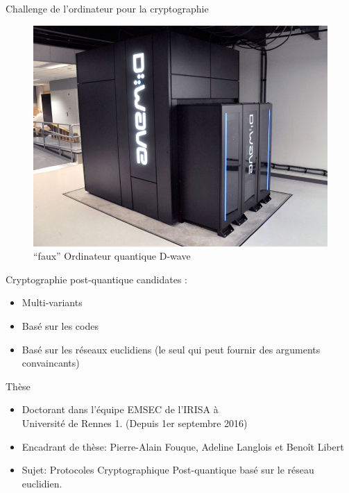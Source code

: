 \begin{frame}{Challenge de l'ordinateur pour la cryptographie}

  \begin{figure}[H]
    \centering
    \includegraphics[width= .2\textwidth]{./images/quantum.jpg}
    \caption{``faux'' Ordinateur quantique D-wave}
  \end{figure}
  
  Cryptographie post-quantique candidates :

  \begin{itemize}
  \item Multi-variants
  \item Bas\'e sur les codes
  \item Bas\'e sur les r\'eseaux euclidiens (le seul qui peut fournir des arguments convaincants)
  \end{itemize}

\end{frame}


\begin{frame}{Th\`ese}
  \begin{itemize}
  \item Doctorant dans l'\'equipe EMSEC de l'IRISA \`a \\Universit\'e de Rennes 1. (Depuis 1er septembre 2016)
  \item Encadrant de th\`ese: Pierre-Alain Fouque, Adeline Langlois et Beno\^it Libert
  \item Sujet: Protocoles Cryptographique Post-quantique bas\'e sur le r\'eseau euclidien.
  \end{itemize}
\end{frame}
